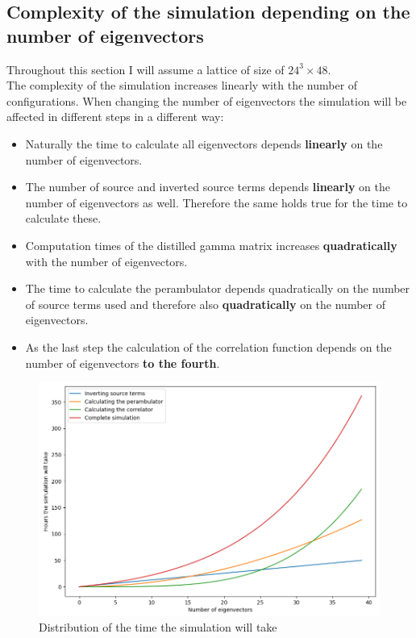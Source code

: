 \subsection{Complexity of the simulation depending on the number of eigenvectors}

Throughout this section I will assume a lattice of size of $24^3 \times 48$.\\

\noindent
The complexity of the simulation increases linearly with the number of configurations. When changing the number of eigenvectors the simulation will be affected in different steps in a different way:

\begin{itemize}
    \item Naturally the time to calculate all eigenvectors depends \textbf{linearly} on the number of eigenvectors.
    \item The number of source and inverted source terms depends \textbf{linearly} on the number of eigenvectors as well. Therefore the same holds true for the time to calculate these.
    \item Computation times of the distilled gamma matrix increases \textbf{quadratically} with the number of eigenvectors.
    \item The time to calculate the perambulator depends quadratically on the number of source terms used and therefore also \textbf{quadratically} on the number of eigenvectors.
    \item As the last step the calculation of the correlation function depends on the number of eigenvectors \textbf{to the fourth}.
\end{itemize}

\begin{figure}[H]
        \centering
        \includegraphics[width=1\textwidth]{images/time_of_sim.png}
        \caption{Distribution of the time the simulation will take}
        \label{time_of_sim}
    \end{figure}

